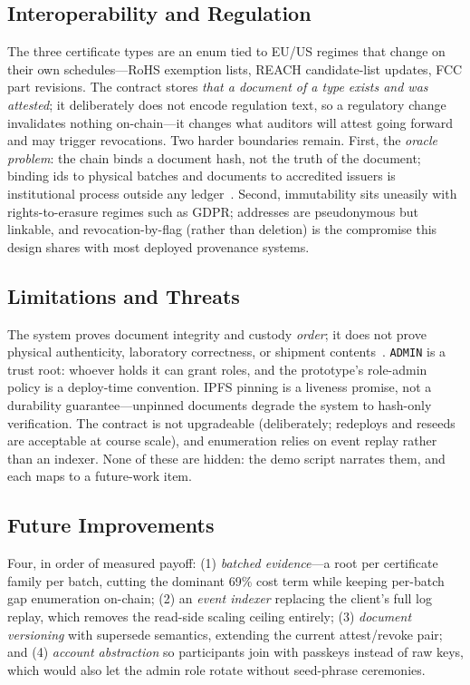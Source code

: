 \documentclass[conference]{IEEEtran}
\begin{document}
\subsection{Interoperability and Regulation}
The three certificate types are an enum tied to EU/US regimes that change on their own schedules---RoHS exemption lists, REACH candidate-list updates, FCC part revisions. The contract stores \emph{that a document of a type exists and was attested}; it deliberately does not encode regulation text, so a regulatory change invalidates nothing on-chain---it changes what auditors will attest going forward and may trigger revocations. Two harder boundaries remain. First, the \emph{oracle problem}: the chain binds a document hash, not the truth of the document; binding ids to physical batches and documents to accredited issuers is institutional process outside any ledger~\cite{guin}. Second, immutability sits uneasily with rights-to-erasure regimes such as GDPR; addresses are pseudonymous but linkable, and revocation-by-flag (rather than deletion) is the compromise this design shares with most deployed provenance systems.

\subsection{Limitations and Threats}
The system proves document integrity and custody \emph{order}; it does not prove physical authenticity, laboratory correctness, or shipment contents~\cite{guin}. \texttt{ADMIN} is a trust root: whoever holds it can grant roles, and the prototype's role-admin policy is a deploy-time convention. IPFS pinning is a liveness promise, not a durability guarantee---unpinned documents degrade the system to hash-only verification. The contract is not upgradeable (deliberately; redeploys and reseeds are acceptable at course scale), and enumeration relies on event replay rather than an indexer. None of these are hidden: the demo script narrates them, and each maps to a future-work item.

\subsection{Future Improvements}\label{sec:future}
Four, in order of measured payoff: (1) \emph{batched evidence}---a root per certificate family per batch, cutting the dominant 69\% cost term while keeping per-batch gap enumeration on-chain; (2) an \emph{event indexer} replacing the client's full log replay, which removes the read-side scaling ceiling entirely; (3) \emph{document versioning} with supersede semantics, extending the current attest/revoke pair; and (4) \emph{account abstraction} so participants join with passkeys instead of raw keys, which would also let the admin role rotate without seed-phrase ceremonies.
\end{document}
